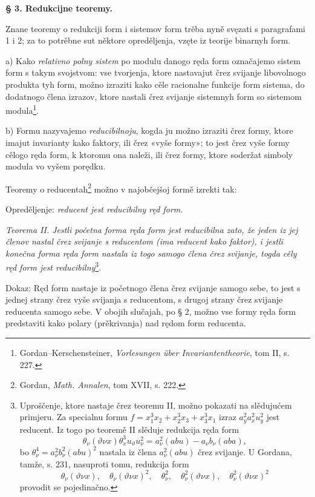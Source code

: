 \documentclass[11pt]{article}
\begin{document}
\begin{center}
\textbf{§ 3. \quad Redukcijne teoremy.}
\end{center}

Znane teoremy o redukciji form i sistemov form trěba nyně svęzati s paragrafami 1 i 2; za to potrěbne sut něktore opreděljenja, vzęte iz teorije binarnyh form.

a) Kako {\itshape relativno polny sistem} po modulu danogo ręda form označajemo sistem form s takym svojstvom: vse tvorjenja, ktore nastavajut črez svijanje libovolnogo produkta tyh form, možno izraziti kako cěle racionalne funkcije form sistema, do dodatnogo člena izrazov, ktore nastali črez svijanje sistemnyh form so sistemom modula\footnote{Gordan--Kerschensteiner, \emph{Vorlesungen über Invariantentheorie}, tom II, s. 227.}.

b) Formu nazyvajemo {\itshape reducibilnoju}, kogda ju možno izraziti črez formy, ktore imajut invarianty kako faktory, ili črez «vyše formy»; to jest črez vyše formy cělogo ręda form, k ktoromu ona naleži, ili črez formy, ktore soderžat simboly modula vo vyšem porędku.

Teoremy o reducentah\footnote{Gordan, \emph{Math. Annalen}, tom XVII, s. 222.} možno v najobčejšoj formě izrekti tak:

Opreděljenje: {\itshape reducent jest reducibilny ręd form.}

{\itshape Teorema II. Jestli početna forma ręda form jest reducibilna zato, že jeden iz jej členov nastal črez svijanje s reducentom (ima reducent kako faktor), i jestli konečna forma ręda form nastala iz togo samogo člena črez svijanje, togda cěly ręd form jest reducibilny}\footnote{Uproščenje, ktore nastaje črez teoremu II, možno pokazati na slědujućem primjeru. Za specialnu formu $f=x_1^3x_2+x_2^3x_3+x_3^3x_1$ izraz $a_y^2a_x^2u_y^2$ jest reducent. Iz togo po teoremě II slěduje redukcija ręda form
\[
\theta_\nu(\vartheta\nu x)\theta_x^3u_\vartheta u_\nu^2
=
a_\nu^2(abu)-a_\nu b_\nu(aba),
\]
bo $\theta_\nu^4=a_\nu^2b_\nu^2(abu)^2$ nastala iz člena $a_\nu^2(abu)$ črez svijanje. U Gordana, tamže, s. 231, nasuproti tomu, redukcija form
\[
\theta_\nu(\vartheta\nu x),\quad \theta_\nu(\vartheta\nu x)^2,\quad
\theta_\nu^2,\quad \theta_\nu^2(\vartheta\nu x),\quad
\theta_\nu^2(\vartheta\nu x)^2
\]
provodit se pojedinačno.}.

Dokaz: Ręd form nastaje iz početnogo člena črez svijanje samogo sebe, to jest s jednej strany črez vyše svijanja s reducentom, s drugoj strany črez svijanje reducenta samogo sebe. V obojih slučajah, po § 2, možno vse formy ręda form predstaviti kako polary (prěkrivanja) nad rędom form reducenta.
\end{document}
